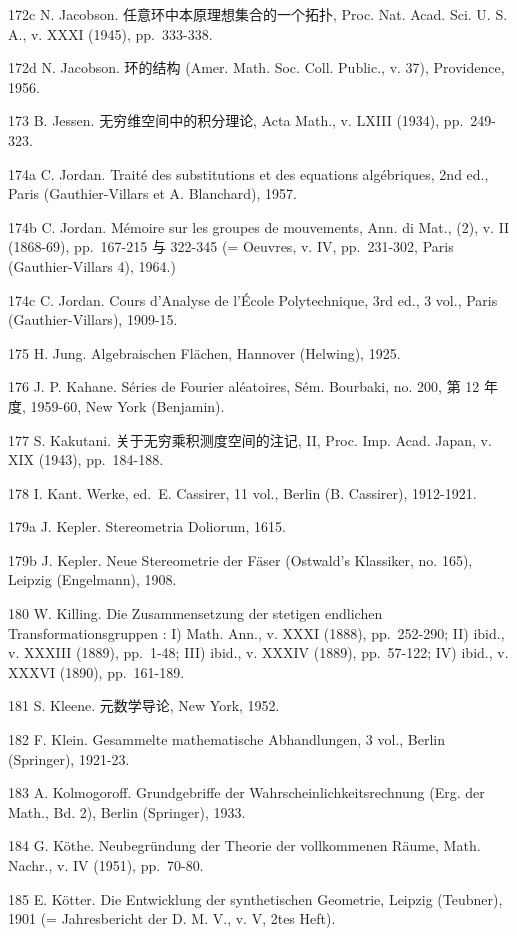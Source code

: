 172c N. Jacobson. 任意环中本原理想集合的一个拓扑, Proc. Nat. Acad. Sci. U. S. A., v. XXXI (1945), pp.~333-338.

172d N. Jacobson. 环的结构 (Amer. Math. Soc. Coll. Public., v. 37), Providence, 1956.

173 B. Jessen. 无穷维空间中的积分理论, Acta Math., v. LXIII (1934), pp.~249-323.

174a C. Jordan. Traité des substitutions et des equations algébriques, 2nd ed., Paris (Gauthier-Villars et A. Blanchard), 1957.

174b C. Jordan. Mémoire sur les groupes de mouvements, Ann. di Mat., (2), v. II (1868-69), pp.~167-215 与 322-345 (= Oeuvres, v. IV, pp.~231-302, Paris (Gauthier-Villars 4), 1964.)

174c C. Jordan. Cours d'Analyse de l'École Polytechnique, 3rd ed., 3 vol., Paris (Gauthier-Villars), 1909-15.

175 H. Jung. Algebraischen Flächen, Hannover (Helwing), 1925.

176 J. P. Kahane. Séries de Fourier aléatoires, Sém. Bourbaki, no. 200, 第 12 年度, 1959-60, New York (Benjamin).

177 S. Kakutani. 关于无穷乘积测度空间的注记, II, Proc. Imp. Acad. Japan, v. XIX (1943), pp.~184-188.

178 I. Kant. Werke, ed.~E. Cassirer, 11 vol., Berlin (B. Cassirer), 1912-1921.

179a J. Kepler. Stereometria Doliorum, 1615.

179b J. Kepler. Neue Stereometrie der Fäser (Ostwald's Klassiker, no. 165), Leipzig (Engelmann), 1908.

180 W. Killing. Die Zusammensetzung der stetigen endlichen Transformationsgruppen : I) Math. Ann., v. XXXI (1888), pp.~252-290; II) ibid., v. XXXIII (1889), pp.~1-48; III) ibid., v. XXXIV (1889), pp.~57-122; IV) ibid., v. XXXVI (1890), pp.~161-189.

181 S. Kleene. 元数学导论, New York, 1952.

182 F. Klein. Gesammelte mathematische Abhandlungen, 3 vol., Berlin (Springer), 1921-23.

183 A. Kolmogoroff. Grundgebriffe der Wahrscheinlichkeitsrechnung (Erg. der Math., Bd. 2), Berlin (Springer), 1933.

184 G. Köthe. Neubegründung der Theorie der vollkommenen Räume, Math. Nachr., v. IV (1951), pp.~70-80.

185 E. Kötter. Die Entwicklung der synthetischen Geometrie, Leipzig (Teubner), 1901 (= Jahresbericht der D. M. V., v. V, 2tes Heft).

